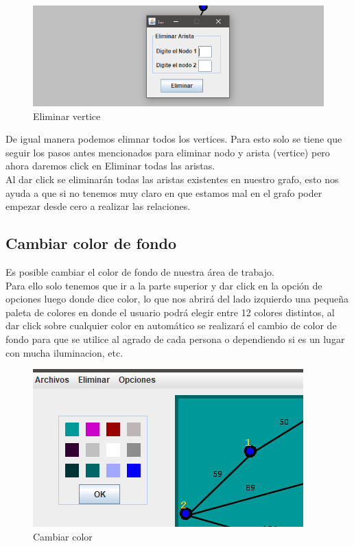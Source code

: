 \begin{figure}[h!]
\centering
\includegraphics[scale=1]{img/deleteA.PNG}
\caption{Eliminar vertice}
\label{Comandos}
\end{figure}

De igual manera podemos elimnar todos los vertices. Para esto solo se tiene que seguir los pasos antes mencionados para eliminar nodo y arista (vertice) pero ahora daremos click en Eliminar todas las aristas. 
\\
Al dar click se eliminarán todas las aristas existentes en nuestro grafo, esto nos ayuda a que si no tenemos muy claro en que estamos mal en el grafo poder empezar desde cero a realizar las relaciones.

\subsection{Cambiar color de fondo}
Es posible cambiar el color de fondo de nuestra área de trabajo. 
\\
Para ello solo tenemos que ir a la parte superior y dar click en la opción de opciones luego donde dice color, lo que nos abrirá del lado izquierdo una pequeña paleta de colores en donde el usuario podrá elegir entre 12 colores distintos, al dar click sobre cualquier color en automático se realizará el cambio de color de fondo para que se utilice al agrado de cada persona o dependiendo si es un lugar con mucha iluminacion, etc. 

\begin{figure}[h!]
\centering
\includegraphics[scale=.75]{img/color.PNG}
\caption{Cambiar color}
\label{Comandos}
\end{figure}
\\

